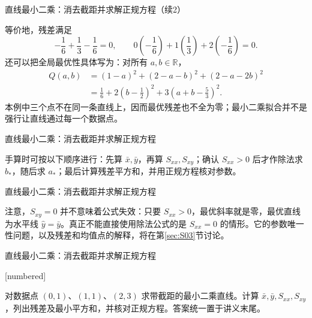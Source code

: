 \documentclass[aspectratio=169,10pt,fontset=fandol]{ctexbeamer}
\makeatletter
\newcommand{\mathagentexerciselabelcontext}[1]{%
\hypertarget<1>{#1}{}%
\edef\@currentHref{#1}%
}
\makeatother
\begin{document}
\begin{frame}[t,fragile]{直线最小二乘：消去截距并求解正规方程（续2）}
\footnotesize
{\footnotesize
等价地，残差满足
\[
-\frac16+\frac13-\frac16=0,\qquad
0\left(-\frac16\right)+1\left(\frac13\right)+2\left(-\frac16\right)=0.
\]
还可以把全局最优性具体写为：对所有 $a,b\in\mathbb{R}$，
\[
\begin{aligned}
Q(a,b)&=(1-a)^2+(2-a-b)^2+(2-a-2b)^2\\
&=\frac16+2\left(b-\frac12\right)^2+3\left(a+b-\frac53\right)^2.
\end{aligned}
\]
本例中三个点不在同一条直线上，因而最优残差也不全为零；最小二乘拟合并不是强行让直线通过每一个数据点。\par

}
\end{frame}
\begin{frame}[t,fragile]{直线最小二乘：消去截距并求解正规方程}
\footnotesize
{\footnotesize
手算时可按以下顺序进行：先算 $\bar{x},\bar{y}$，再算 $S_{xx},S_{xy}$；确认 $S_{xx}>0$ 后才作除法求 $b_*$，随后求 $a_*$；最后计算残差平方和，并用正规方程核对参数。


}
\end{frame}
\begin{frame}[t,fragile]{直线最小二乘：消去截距并求解正规方程}
\footnotesize
{\footnotesize
注意，$S_{xy}=0$ 并不意味着公式失效：只要 $S_{xx}>0$，最优斜率就是零，最优直线为水平线 $\hat{y}=\bar{y}$。真正不能直接使用除法公式的是 $S_{xx}=0$ 的情形。它的参数唯一性问题，以及残差和均值点的解释，将在第\ref{sec:S03}节讨论。\par

}
\end{frame}
\begin{frame}[t,fragile]{直线最小二乘：消去截距并求解正规方程}
\normalsize
{\normalsize
[numbered]
\mathagentexerciselabelcontext{mathagent.exercise.U0028.0}
\begin{exercise}
\label{mathagent:exercise:332ae2e99c79cf97370ba4732967ff23f2a2c4a4b36b98eda8e910755bf43b8b}
对数据点 $(0,1)$、$(1,1)$、$(2,3)$ 求带截距的最小二乘直线。计算 $\bar{x},\bar{y},S_{xx},S_{xy}$，列出残差及最小平方和，并核对正规方程。答案统一置于讲义末尾。
\end{exercise}
}
\end{frame}
\end{document}

